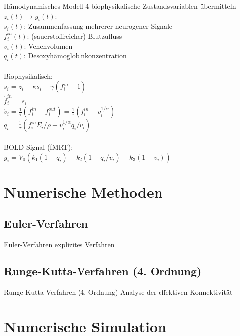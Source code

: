 \documentclass{beamer}
\begin{document}
\begin{frame}{Hämodynamisches Modell}
4 biophysikalische Zustandsvariablen übermitteln $z_i(t)\rightarrow y_i(t)$:\\
$s_i(t)$: Zusammenfassung mehrerer neurogener Signale\\$ f^{in}_i(t)$: (sauerstoffreicher) Blutzufluss \\$ v_i(t)$: Venenvolumen \\$ q_i(t)$: Desoxyhämoglobinkonzentration~\\~\\
Biophysikalisch:~\\
$\dot{s}_i=z_i-\kappa s_i -\gamma (f^{in}_i-1)$\\
$\dot{f}^{in}_i=s_i$\\
$\dot{v}_i=\frac{1}{\tau}(f^{in}_i-f^{out}_i)=\frac{1}{\tau}(f^{in}_i-v_i^{1/\alpha})$\\
$\dot{q}_i=\frac{1}{\tau}(f^{in}_iE_i/\rho-v_i^{1/\alpha}q_i/v_i)$\\~\\
BOLD-Signal (fMRT):\\ $y_i=V_0(k_1(1-q_i)+k_2(1-q_i/v_i)+k_3(1-v_i))$
\end{frame}

\section{Numerische Methoden}
\subsection{Euler-Verfahren}
	\begin{frame}{Euler-Verfahren}
		explizites Verfahren
	\end{frame}
	
\subsection{Runge-Kutta-Verfahren (4. Ordnung)}
	\begin{frame}{Runge-Kutta-Verfahren (4. Ordnung)}
		Analyse der effektiven Konnektivität
	\end{frame}

\section{Numerische Simulation}
\end{document}

